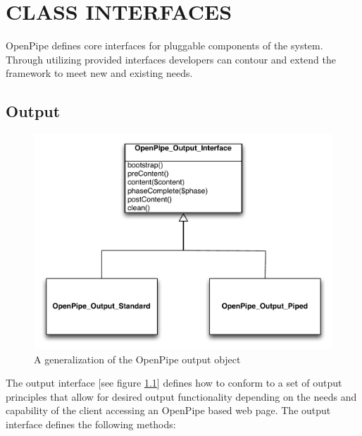\documentclass[12pt]{report}
\begin{document}

\chapter{CLASS INTERFACES}

OpenPipe defines core interfaces for pluggable components of the system. Through utilizing provided interfaces developers can contour and extend the framework to meet new and existing needs. 

\section{Output}

\begin{figure}[H]
\label{fig:generalizationOutput}
\centering
\includegraphics[width=\textwidth,keepaspectratio]{figures/images/generalization_output.pdf}
\caption{A generalization of the OpenPipe output object}
\end{figure}

The output interface [see figure \ref{fig:generalizationOutput}] defines how to conform to a set of output principles that allow for desired output functionality depending on the needs and capability of the client accessing an OpenPipe based web page.  The output interface defines the following methods:
\end{document}
